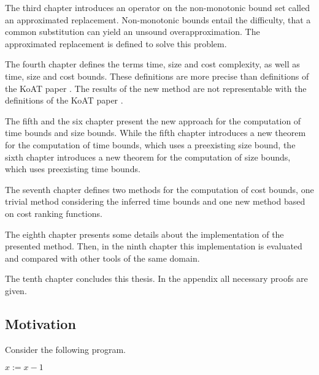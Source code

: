 The third chapter introduces an operator on the non-monotonic bound set called an approximated replacement.
Non-monotonic bounds entail the difficulty, that a common substitution can yield an unsound overapproximation.
The approximated replacement is defined to solve this problem.

The fourth chapter defines the terms time, size and cost complexity, as well as time, size and cost bounds.
These definitions are more precise than definitions of the KoAT paper \cite{koat}.
The results of the new method are not representable with the definitions of the KoAT paper \cite{koat}.

The fifth and the six chapter present the new approach for the computation of time bounds and size bounds.
While the fifth chapter introduces a new theorem for the computation of time bounds, which uses a preexisting size bound, the sixth chapter introduces a new theorem for the computation of size bounds, which uses preexisting time bounds.

The seventh chapter defines two methods for the computation of cost bounds, one trivial method considering the inferred time bounds and one new method based on cost ranking functions.

The eighth chapter presents some details about the implementation of the presented method.
Then, in the ninth chapter this implementation is evaluated and compared with other tools of the same domain.

The tenth chapter concludes this thesis.
In the appendix all necessary proofs are given.

\subsection{Motivation}

Consider the following program.

\begin{algorithmic}
    \State $x := x - 1$
  \EndWhile
\end{algorithmic}

